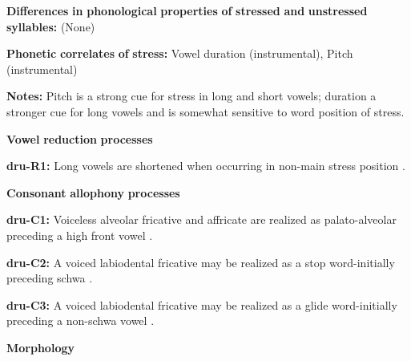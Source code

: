 \begin{styleBody}
\textbf{Differences} \textbf{in} \textbf{phonological} \textbf{properties} \textbf{of} \textbf{stressed} \textbf{and} \textbf{unstressed} \textbf{syllables:} (None)
\end{styleBody}

\begin{styleBody}
\textbf{Phonetic} \textbf{correlates} \textbf{of} \textbf{stress:} Vowel duration (instrumental), Pitch (instrumental)
\end{styleBody}

\begin{styleBody}
\textbf{Notes:} Pitch is a strong cue for stress in long and short vowels; duration a stronger cue for long vowels and is somewhat sensitive to word position of stress.
\end{styleBody}

\begin{styleBody}
\textbf{Vowel} \textbf{reduction} \textbf{processes}
\end{styleBody}

\begin{styleBody}
\textbf{dru-R1:} Long vowels are shortened when occurring in non-main stress position \citep[257]{Chen2006}.
\end{styleBody}

\begin{styleBody}
\textbf{Consonant} \textbf{allophony} \textbf{processes}
\end{styleBody}

\begin{styleBody}
\textbf{dru-C1:} Voiceless alveolar fricative and affricate are realized as palato-alveolar preceding a high front vowel \citep[230]{Chen2006}.
\end{styleBody}

\begin{styleBody}
\textbf{dru-C2:} A voiced labiodental fricative may be realized as a stop word-initially preceding schwa \citep[227]{Chen2006}.
\end{styleBody}

\begin{styleBody}
\textbf{dru-C3:} A voiced labiodental fricative may be realized as a glide word-initially preceding a non-schwa vowel \citep[227]{Chen2006}.
\end{styleBody}

\begin{styleBody}
\textbf{Morphology}
\end{styleBody}

